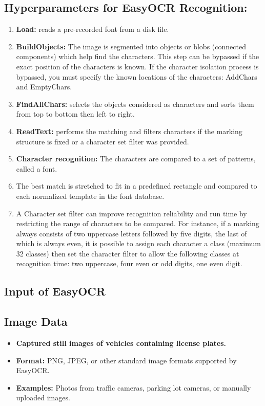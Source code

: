 \subsection*{Hyperparameters for EasyOCR Recognition:} \cite{EasyOCR:2018}
\begin{enumerate}
	\item \textbf{Load:} reads a pre-recorded font from a disk file.
	\item \textbf{BuildObjects:} The image is segmented into objects or blobs (connected components) which help find the characters. This step can be bypassed if the exact position of the characters is known. If the character isolation process is bypassed, you must specify the known locations of the characters: AddChars and EmptyChars.
	\item \textbf{FindAllChars:} selects the objects considered as characters and sorts them from top to bottom then left to right.
	\item \textbf{ReadText:} performs the matching and filters characters if the marking structure is fixed or a character set filter was provided.
	\item \textbf{Character recognition:} The characters are compared to a set of patterns, called a font.
	\item The best match is stretched to fit in a predefined rectangle and compared to each normalized template in the font database.
	\item A Character set filter can improve recognition reliability and run time by restricting the range of characters to be compared. For instance, if a marking always consists of two uppercase letters followed by five digits, the last of which is always even, it is possible to assign each character a class (maximum 32 classes) then set the character filter to allow the following classes at recognition time: two uppercase, four even or odd digits, one even digit.
\end{enumerate}

\subsection{Input of EasyOCR}

\subsection*{Image Data}
\begin{itemize}
	\item \textbf{Captured still images of vehicles containing license plates.}
	\item \textbf{Format:} PNG, JPEG, or other standard image formats supported by EasyOCR.
	\item \textbf{Examples:} Photos from traffic cameras, parking lot cameras, or manually uploaded images.
\end{itemize}

